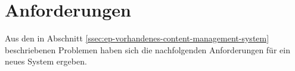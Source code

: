 \section{Anforderungen}
\label{sec:e-anforderungen}

Aus den in Abschnitt \ref{ssec:ep-vorhandenes-content-management-system}
beschriebenen Problemen haben sich die nachfolgenden Anforderungen für ein neues
System ergeben.





